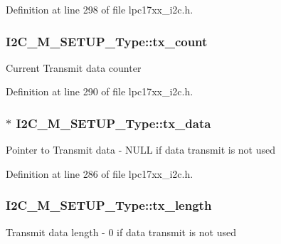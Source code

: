 Definition at line 298 of file lpc17xx\+\_\+i2c.\+h.

\subsubsection[{\texorpdfstring{tx\+\_\+count}{tx_count}}]{ I2\+C\+\_\+\+M\+\_\+\+S\+E\+T\+U\+P\+\_\+\+Type\+::tx\+\_\+count}\hypertarget{struct_i2_c___m___s_e_t_u_p___type_a16c03240bb80a96c6568b3cbf740be94}{}\label{struct_i2_c___m___s_e_t_u_p___type_a16c03240bb80a96c6568b3cbf740be94}
Current Transmit data counter 

Definition at line 290 of file lpc17xx\+\_\+i2c.\+h.

\subsubsection[{\texorpdfstring{tx\+\_\+data}{tx_data}}]{$\ast$ I2\+C\+\_\+\+M\+\_\+\+S\+E\+T\+U\+P\+\_\+\+Type\+::tx\+\_\+data}\hypertarget{struct_i2_c___m___s_e_t_u_p___type_a17bf43e1146272e6a06df8f5adda2e72}{}\label{struct_i2_c___m___s_e_t_u_p___type_a17bf43e1146272e6a06df8f5adda2e72}
Pointer to Transmit data -\/ N\+U\+LL if data transmit is not used 

Definition at line 286 of file lpc17xx\+\_\+i2c.\+h.

\subsubsection[{\texorpdfstring{tx\+\_\+length}{tx_length}}]{ I2\+C\+\_\+\+M\+\_\+\+S\+E\+T\+U\+P\+\_\+\+Type\+::tx\+\_\+length}\hypertarget{struct_i2_c___m___s_e_t_u_p___type_af9632e0a6ac1ee550ec274c50e45af86}{}\label{struct_i2_c___m___s_e_t_u_p___type_af9632e0a6ac1ee550ec274c50e45af86}
Transmit data length -\/ 0 if data transmit is not used 

